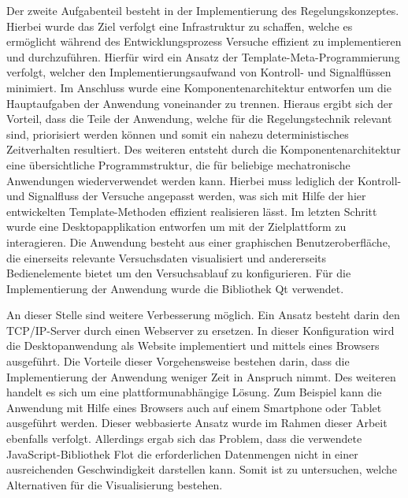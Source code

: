 Der zweite Aufgabenteil besteht in der Implementierung des Regelungskonzeptes. Hierbei wurde das Ziel verfolgt eine Infrastruktur zu schaffen, welche es ermöglicht während des Entwicklungsprozess Versuche effizient zu implementieren und durchzuführen. Hierfür wird ein Ansatz der Template-Meta-Programmierung verfolgt, welcher den Implementierungsaufwand von Kontroll- und Signalflüssen minimiert. Im Anschluss wurde eine Komponentenarchitektur entworfen um die Hauptaufgaben der Anwendung voneinander zu trennen. Hieraus ergibt sich der Vorteil, dass die Teile der Anwendung, welche für die Regelungstechnik relevant sind, priorisiert werden können und somit ein nahezu deterministisches Zeitverhalten resultiert. Des weiteren entsteht durch die Komponentenarchitektur eine übersichtliche Programmstruktur, die für beliebige mechatronische Anwendungen wiederverwendet werden kann. Hierbei muss lediglich der Kontroll- und Signalfluss der Versuche angepasst werden, was sich mit Hilfe der hier entwickelten Template-Methoden effizient realisieren lässt. Im letzten Schritt wurde eine Desktopapplikation entworfen um mit der Zielplattform zu interagieren. Die Anwendung besteht aus einer graphischen Benutzeroberfläche, die einerseits relevante Versuchsdaten visualisiert und andererseits Bedienelemente bietet um den Versuchsablauf zu konfigurieren. Für die Implementierung der Anwendung wurde die Bibliothek Qt verwendet.

An dieser Stelle sind weitere Verbesserung möglich. Ein Ansatz besteht darin den TCP/IP-Server durch einen Webserver zu ersetzen. In dieser Konfiguration wird die Desktopanwendung als Website implementiert und mittels eines Browsers ausgeführt. Die Vorteile dieser Vorgehensweise bestehen darin, dass die Implementierung der Anwendung weniger Zeit in Anspruch nimmt. Des weiteren handelt es sich um eine plattformunabhängige Lösung. Zum Beispiel kann die Anwendung mit Hilfe eines Browsers auch auf einem Smartphone oder Tablet ausgeführt werden. Dieser webbasierte Ansatz wurde im Rahmen dieser Arbeit ebenfalls verfolgt. Allerdings ergab sich das Problem, dass die verwendete JavaScript-Bibliothek Flot die erforderlichen Datenmengen nicht in einer ausreichenden Geschwindigkeit darstellen kann. Somit ist zu untersuchen, welche Alternativen für die Visualisierung bestehen.

